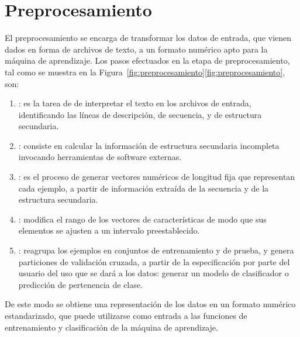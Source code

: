 %
%
%
\section{Preprocesamiento}
%
El preprocesamiento se encarga de transformar los datos de entrada,
que vienen dados en forma de archivos de texto, a un formato numérico
apto para la máquina de aprendizaje.
Los pasos efectuados en la etapa de preprocesamiento, tal como se muestra en la
\iflatexml{}Figura~\ref{fig:preprocesamiento}\else\autoref{fig:preprocesamiento}\fi{},
son:
%
\begin{enumerate}
\item
  : es la tarea de de interpretar el texto
  en los archivos de entrada, identificando las líneas de descripción,
  de secuencia, y de estructura secundaria.
\item
  : consiste en calcular la información de estructura
  secundaria incompleta invocando herramientas de software externas.
\item
  : es el proceso de generar vectores
  numéricos de longitud fija que representan cada ejemplo, a partir de
  información extraída de la secuencia y de la estructura secundaria.
\item
  : modifica el rango de los vectores de
  características de modo que sus elementos se ajusten a un intervalo
  preestablecido.
\item
  : reagrupa los ejemplos en
  conjuntos de entrenamiento y de prueba, y genera particiones de
  validación cruzada, a partir de la especificación por parte del
  usuario del uso que se dará a los datos: generar un modelo de
  clasificador o predicción de pertenencia de clase.
\end{enumerate}
%
De este modo se obtiene una representación de los datos en un formato
numérico estandarizado, que puede utilizarse como entrada a las
funciones de entrenamiento y clasificación de la máquina de
aprendizaje.
